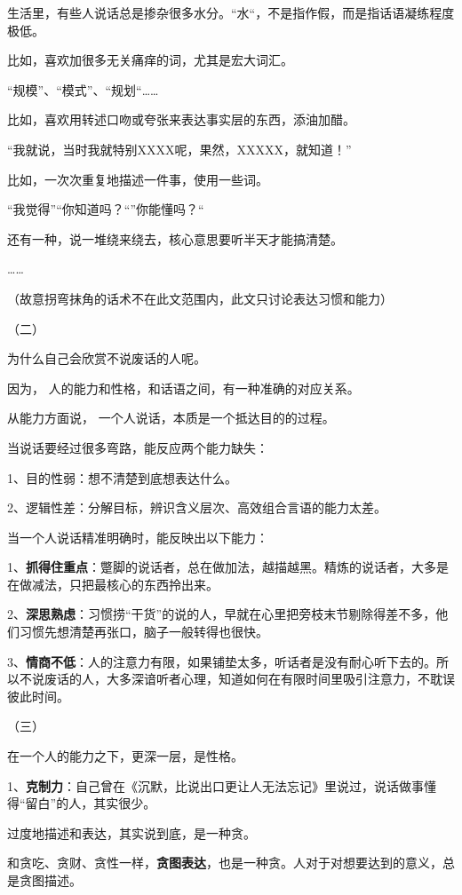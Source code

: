 \documentclass[UTF8,a4paper,8pt]{ctexart}
\begin{document}
 生活里，有些人说话总是掺杂很多水分。“水“，不是指作假，而是指话语凝练程度极低。
 
 比如，喜欢加很多无关痛痒的词，尤其是宏大词汇。
 
 “规模”、“模式”、“规划“……
 
 比如，喜欢用转述口吻或夸张来表达事实层的东西，添油加醋。
 
 “我就说，当时我就特别XXXX呢，果然，XXXXX，就知道！”
 
 比如，一次次重复地描述一件事，使用一些词。
 
 “我觉得”“你知道吗？“”你能懂吗？“
 
 还有一种，说一堆绕来绕去，核心意思要听半天才能搞清楚。
 
 ……
 
 （故意拐弯抹角的话术不在此文范围内，此文只讨论表达习惯和能力）
 
 
 
 （二）
 
 为什么自己会欣赏不说废话的人呢。
 
 因为， 人的能力和性格，和话语之间，有一种准确的对应关系。
 
 从能力方面说， 一个人说话，本质是一个抵达目的的过程。
 
 当说话要经过很多弯路，能反应两个能力缺失：
 
 1、目的性弱：想不清楚到底想表达什么。
 
 2、逻辑性差：分解目标，辨识含义层次、高效组合言语的能力太差。
 
 当一个人说话精准明确时，能反映出以下能力：
 
 1、\textbf{抓得住重点}：蹩脚的说话者，总在做加法，越描越黑。精炼的说话者，大多是在做减法，只把最核心的东西拎出来。
 
 2、\textbf{深思熟虑}：习惯捞“干货”的说的人，早就在心里把旁枝末节剔除得差不多，他们习惯先想清楚再张口，脑子一般转得也很快。
 
 3、\textbf{情商不低}：人的注意力有限，如果铺垫太多，听话者是没有耐心听下去的。所以不说废话的人，大多深谙听者心理，知道如何在有限时间里吸引注意力，不耽误彼此时间。
 
 
 
 （三）
 
 在一个人的能力之下，更深一层，是性格。
 
 1、\textbf{克制力}：自己曾在《沉默，比说出口更让人无法忘记》里说过，说话做事懂得“留白”的人，其实很少。
 
 过度地描述和表达，其实说到底，是一种贪。
 
 和贪吃、贪财、贪性一样，\textbf{贪图表达}，也是一种贪。人对于对想要达到的意义，总是贪图描述。
 
\end{document}
